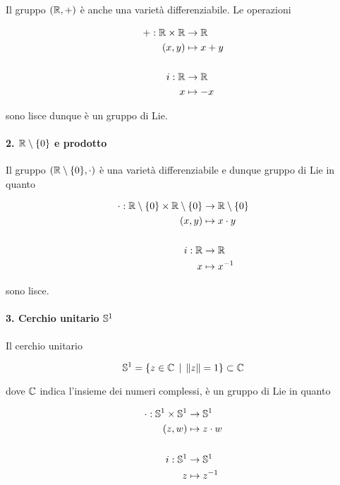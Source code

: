 Il gruppo $ (\R,+) $ è anche una varietà differenziabile. Le operazioni

\begin{align}
	\begin{split}
		+ : \R \times \R &\to \R\\
		(x,y) &\mapsto x+y\\\\
		i : \R &\to \R\\
		x &\mapsto - x
	\end{split}
\end{align}

sono lisce dunque è un gruppo di Lie.

\paragraph{2. $ \R \setminus \{0\} $ e prodotto}

Il gruppo $ (\R \setminus \{0\},\cdot) $ è una varietà differenziabile e dunque gruppo di Lie in quanto

\begin{align}
	\begin{split}
		\cdot : \R \setminus \{0\} \times \R \setminus \{0\} &\to \R \setminus \{0\}\\
		(x,y) &\mapsto x \cdot y\\\\
		i : \R &\to \R\\
		x &\mapsto x^{-1}
	\end{split}
\end{align}

sono lisce.

\paragraph{3. Cerchio unitario $ \S^{1} $}

Il cerchio unitario

\begin{equation}
	\S^{1} = \{ z \in \C \, \mid \, \norm{z} = 1 \} \subset \C
\end{equation}

dove $ \C $ indica l'insieme dei numeri complessi, è un gruppo di Lie in quanto

\begin{align}
	\begin{split}
		\cdot : \S^{1} \times \S^{1} &\to \S^{1}\\
		(z,w) &\mapsto z \cdot w\\\\
		i : \S^{1} &\to \S^{1}\\
		z &\mapsto z^{-1}
	\end{split}
\end{align}

